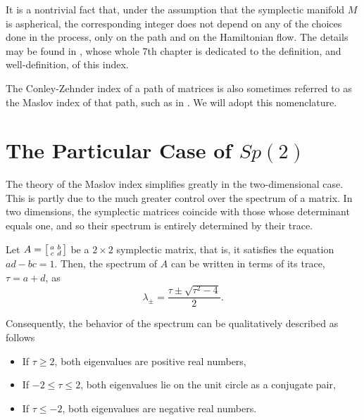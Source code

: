 It is a nontrivial fact that, under the assumption that the symplectic manifold $M$ is aspherical, the corresponding integer does not depend on any of the choices done in the process, only on the path and on the Hamiltonian flow. The details may be found in \cite{audin}, whose whole 7th chapter is dedicated to the definition, and well-definition, of this index.

The Conley-Zehnder index of a path of matrices is also sometimes referred to as the Maslov index of that path, such as in \cite{audin}. We will adopt this nomenclature.

\section{The Particular Case of \texorpdfstring{$Sp(2)$}{Sp(2)}}\label{sec:maslovsp2}

The theory of the Maslov index simplifies greatly in the two-dimensional case. This is partly due to the much greater control over the spectrum of a matrix. In two dimensions, the symplectic matrices coincide with those whose determinant equals one, and so their spectrum is entirely determined by their trace.

\begin{prop}\label{prop:lambdafromtau}
Let $A = \mleft[\begin{smallmatrix} a & b \\ c & d \end{smallmatrix}\mright]$ be a $2 \times 2$ symplectic matrix, that is, it satisfies the equation $ad - bc = 1$. Then, the spectrum of $A$ can be written in terms of its trace, $\tau = a+d$, as
\begin{equation}\label{lambdafromtau}
\lambda_\pm = \frac{\tau \pm \sqrt{\tau^2 - 4}}2.
\end{equation}

Consequently, the behavior of the spectrum can be qualitatively described as follows
\begin{itemize}
\item If $\tau \geq 2$, both eigenvalues are positive real numbers,
\item If $-2 \leq \tau \leq 2$, both eigenvalues lie on the unit circle as a conjugate pair,
\item If $\tau \leq -2$, both eigenvalues are negative real numbers.
\end{itemize}
\end{prop}

